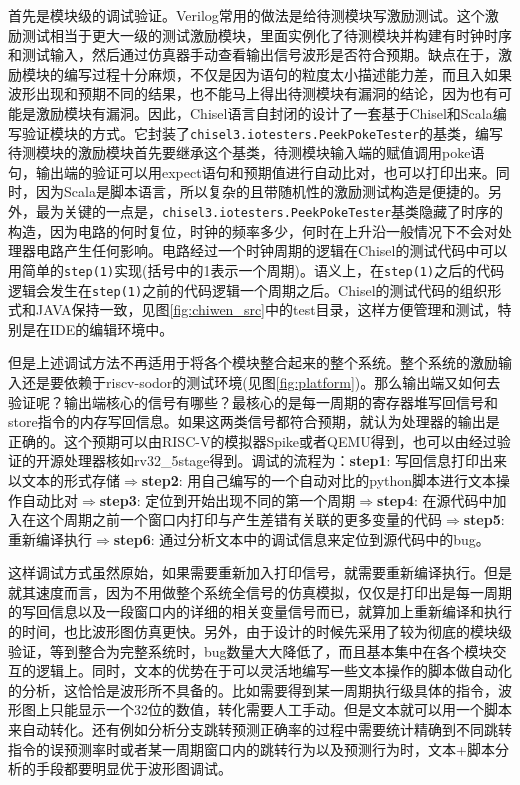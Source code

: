 首先是模块级的调试验证。Verilog常用的做法是给待测模块写激励测试。这个激励测试相当于更大一级的测试激励模块，里面实例化了待测模块并构建有时钟时序和测试输入，然后通过仿真器手动查看输出信号波形是否符合预期。缺点在于，激励模块的编写过程十分麻烦，不仅是因为语句的粒度太小描述能力差，而且入如果波形出现和预期不同的结果，也不能马上得出待测模块有漏洞的结论，因为也有可能是激励模块有漏洞。因此，Chisel语言自封闭的设计了一套基于Chisel和Scala编写验证模块的方式。它封装了\texttt{\footnotesize{chisel3.iotesters.PeekPokeTester}}的基类，编写待测模块的激励模块首先要继承这个基类，待测模块输入端的赋值调用poke语句，输出端的验证可以用expect语句和预期值进行自动比对，也可以打印出来。同时，因为Scala是脚本语言，所以复杂的且带随机性的激励测试构造是便捷的。另外，最为关键的一点是，\texttt{\footnotesize{chisel3.iotesters.PeekPokeTester}}基类隐藏了时序的构造，因为电路的何时复位，时钟的频率多少，何时在上升沿一般情况下不会对处理器电路产生任何影响。电路经过一个时钟周期的逻辑在Chisel的测试代码中可以用简单的\texttt{step(1)}实现(括号中的1表示一个周期)。语义上，在\texttt{step(1)}之后的代码逻辑会发生在\texttt{step(1)}之前的代码逻辑一个周期之后。Chisel的测试代码的组织形式和JAVA保持一致，见图\ref{fig:chiwen_src}中的test目录，这样方便管理和测试，特别是在IDE的编辑环境中。

但是上述调试方法不再适用于将各个模块整合起来的整个系统。整个系统的激励输入还是要依赖于riscv-sodor的测试环境(见图\ref{fig:platform})。那么输出端又如何去验证呢？输出端核心的信号有哪些？最核心的是每一周期的寄存器堆写回信号和store指令的内存写回信息。如果这两类信号都符合预期，就认为处理器的输出是正确的。这个预期可以由RISC-V的模拟器Spike或者QEMU得到，也可以由经过验证的开源处理器核如rv32\_5stage得到。调试的流程为：\textbf{step1}: 写回信息打印出来以文本的形式存储$ \Rightarrow $\textbf{step2}: 用自己编写的一个自动对比的python脚本进行文本操作自动比对$ \Rightarrow $\textbf{step3}: 定位到开始出现不同的第一个周期$ \Rightarrow $\textbf{step4}: 在源代码中加入在这个周期之前一个窗口内打印与产生差错有关联的更多变量的代码$ \Rightarrow $\textbf{step5}: 重新编译执行$ \Rightarrow $\textbf{step6}: 通过分析文本中的调试信息来定位到源代码中的bug。

这样调试方式虽然原始，如果需要重新加入打印信号，就需要重新编译执行。但是就其速度而言，因为不用做整个系统全信号的仿真模拟，仅仅是打印出是每一周期的写回信息以及一段窗口内的详细的相关变量信号而已，就算加上重新编译和执行的时间，也比波形图仿真更快。另外，由于设计的时候先采用了较为彻底的模块级验证，等到整合为完整系统时，bug数量大大降低了，而且基本集中在各个模块交互的逻辑上。同时，文本的优势在于可以灵活地编写一些文本操作的脚本做自动化的分析，这恰恰是波形所不具备的。比如需要得到某一周期执行级具体的指令，波形图上只能显示一个32位的数值，转化需要人工手动。但是文本就可以用一个脚本来自动转化。还有例如分析分支跳转预测正确率的过程中需要统计精确到不同跳转指令的误预测率时或者某一周期窗口内的跳转行为以及预测行为时，文本+脚本分析的手段都要明显优于波形图调试。

